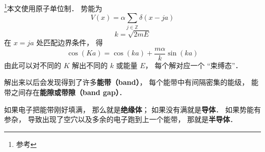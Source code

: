 

\footnote{参考\cite{GriffQ}}本文使用原子单位制． 势能为
\begin{equation}
V(x) = \alpha \sum_{j\in \mathbb Z} \delta(x - ja)
\end{equation}
\begin{equation}
k = \sqrt{2mE}
\end{equation}
在 $x = ja$ 处匹配边界条件， 得
\begin{equation}
\cos(K a) = \cos(ka) + \frac{m\alpha}{k}\sin(ka)
\end{equation}
由此可以对不同的 $K$ 解出不同的 $k$ 或能量 $E$， 每个解对应一个 “束缚态”．

解出来以后会发现得到了许多\textbf{能带（band）}， 每个能带中有间隔密集的能级， 能带之间存在\textbf{能隙或带隙（band gap）}．

如果电子把能带刚好填满， 那么就是\textbf{绝缘体}； 如果没有满就是\textbf{导体}． 如果势能有参杂， 导致出现了空穴以及多余的电子跑到上一个能带， 那就是\textbf{半导体}．
